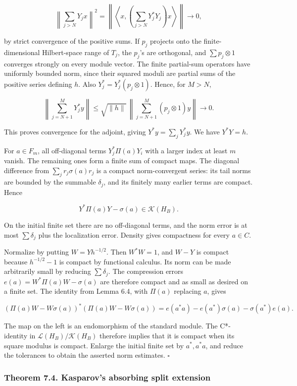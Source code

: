 \documentclass[
  11pt,
]{article}
\begin{document}
\[
\left\|\sum_{j>N}Y_jx\right\|^2
=\left\|\left\langle x,\left(\sum_{j>N}Y_j^*Y_j\right)x\right\rangle\right\|\longrightarrow0,
\]

by strict convergence of the positive sums. If \(p_j\) projects onto the
finite-dimensional Hilbert-space range of \(T_j\), the \(p_j\)'s are
orthogonal, and \(\sum p_j\otimes1\) converges strongly on every module
vector. The finite partial-sum operators have uniformly bounded norm,
since their squared moduli are partial sums of the positive series
defining \(h\). Also \(Y_j^*=Y_j^*(p_j\otimes1)\). Hence, for \(M>N\),

\[
\left\|\sum_{j=N+1}^M Y_j^*y\right\|
\leq\sqrt{\|h\|}\,
\left\|\sum_{j=N+1}^M(p_j\otimes1)y\right\|\longrightarrow0.
\]

This proves convergence for the adjoint, giving \(Y^*y=\sum_jY_j^*y\).
We have \(Y^*Y=h\).

For \(a\in F_m\), all off-diagonal terms \(Y_j^*\Pi(a)Y_i\) with a
larger index at least \(m\) vanish. The remaining ones form a finite sum
of compact maps. The diagonal difference from \(\sum_j r_j\sigma(a)r_j\)
is a compact norm-convergent series: its tail norms are bounded by the
summable \(\delta_j\), and its finitely many earlier terms are compact.
Hence

\[
Y^*\Pi(a)Y-\sigma(a)\in\mathcal K(H_B).
\]

On the initial finite set there are no off-diagonal terms, and the norm
error is at most \(\sum\delta_j\) plus the localization error. Density
gives compactness for every \(a\in C\).

Normalize by putting \(W=Yh^{-1/2}\). Then \(W^*W=1\), and \(W-Y\) is
compact because \(h^{-1/2}-1\) is compact by functional calculus. Its
norm can be made arbitrarily small by reducing \(\sum\delta_j\). The
compression errors \(e(a)=W^*\Pi(a)W-\sigma(a)\) are therefore compact
and as small as desired on a finite set. The identity from Lemma 6.4,
with \(\Pi(a)\) replacing \(a\), gives

\[
(\Pi(a)W-W\sigma(a))^*(\Pi(a)W-W\sigma(a))
=e(a^*a)-e(a^*)\sigma(a)-\sigma(a^*)e(a).
\]

The map on the left is an endomorphism of the standard module. The
C*-identity in \(\mathcal L(H_B)/\mathcal K(H_B)\) therefore implies
that it is compact when its square modulus is compact. Enlarge the
initial finite set by \(a^*,a^*a\), and reduce the tolerances to obtain
the asserted norm estimates. \(\square\)

\subsubsection{Theorem 7.4. Kasparov's absorbing split
extension}\label{theorem-7.4.-kasparovs-absorbing-split-extension}
\end{document}
